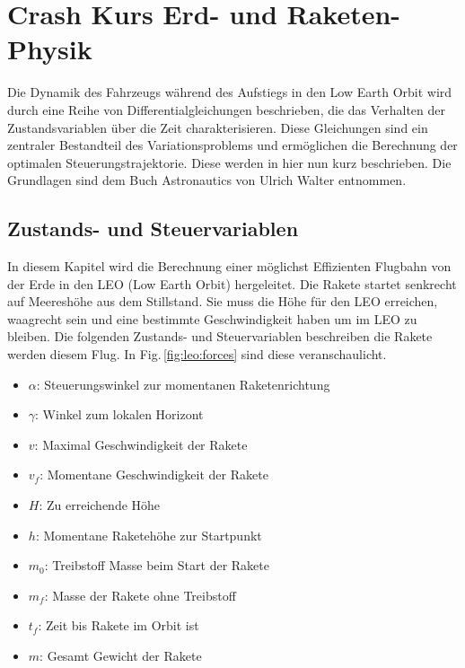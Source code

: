 %
%
%
%
\section{Crash Kurs Erd- und Raketen-Physik
\label{leo:section:physik}}
Die Dynamik des Fahrzeugs während des Aufstiegs in den Low Earth Orbit wird durch eine Reihe von Differentialgleichungen beschrieben, die das Verhalten der Zustandsvariablen über die Zeit charakterisieren. 
Diese Gleichungen sind ein zentraler Bestandteil des Variationsproblems und ermöglichen die Berechnung der optimalen Steuerungstrajektorie. Diese werden in hier nun kurz beschrieben.
Die Grundlagen sind dem Buch Astronautics von Ulrich Walter \cite{leo:astronautics} entnommen.


\subsection{Zustands- und Steuervariablen\label{leo:section:variabeln}}
In diesem Kapitel wird die Berechnung einer möglichst Effizienten Flugbahn von der Erde in den LEO (Low Earth Orbit) hergeleitet. 
Die Rakete startet senkrecht auf Meereshöhe aus dem Stillstand. 
Sie muss die Höhe für den LEO erreichen, waagrecht sein und eine bestimmte Geschwindigkeit haben um im LEO zu bleiben. 
Die folgenden Zustands- und Steuervariablen beschreiben die Rakete werden diesem Flug.
In Fig.\,\ref{fig:leo:forces} sind diese veranschaulicht.

\begin{itemize}
	\item $\alpha$: Steuerungswinkel  zur momentanen Raketenrichtung
	\item $\gamma$: Winkel zum lokalen Horizont
	\item $v$: Maximal Geschwindigkeit der Rakete
	\item $v_f$: Momentane Geschwindigkeit der Rakete
	\item $H$: Zu erreichende Höhe
	\item $h$: Momentane Raketehöhe zur Startpunkt
	\item $m_0$: Treibstoff Masse beim Start der Rakete
	\item $m_f$: Masse der Rakete ohne Treibstoff
	\item $t_f$: Zeit bis Rakete im Orbit ist
	\item $m$: Gesamt Gewicht der Rakete
\end{itemize}

